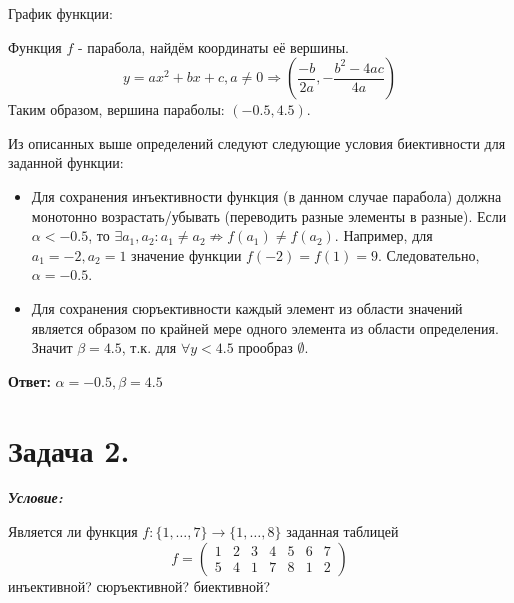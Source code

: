 График функции:
\begin{figure}[H]
\end{figure}
\noindent Функция $f$ - парабола, найдём координаты её вершины.
\[ y = ax^2 + bx + c, a \ne 0 \Rightarrow \left( \frac{-b}{2a}, -\frac{b^2-4ac}{4a} \right) \]
Таким образом, вершина параболы: $(-0.5, 4.5)$.

Из описанных выше определений следуют следующие условия биективности для заданной функции:
\begin{itemize}
	\item Для сохранения инъективности функция (в данном случае парабола) должна монотонно возрастать/убывать (переводить разные элементы в разные). Если $\alpha < -0.5$, то $\exists a_1, a_2: a_1 \ne a_2 \not\Rightarrow f(a_1) \ne f(a_2)$. Например, для $a_1 = -2, a_2 = 1$ значение функции $f(-2) = f(1) = 9$. Следовательно, $\alpha = -0.5$.
	\item Для сохранения сюръективности каждый элемент из области значений является образом по крайней мере одного элемента из области определения. Значит $\beta = 4.5$, т.к. для $\forall y < 4.5$ прообраз $\emptyset$.
\end{itemize}

\noindent\textbf{Ответ:} $\alpha = -0.5, \beta = 4.5$

\section*{Задача 2.}

\noindent\textbf{\textit{Условие:}}

Является ли функция $f: \{1, \dots, 7\} \to \{1, \dots, 8\}$ заданная таблицей
\[
f =
\begin{pmatrix}
1 & 2 & 3 & 4 & 5 & 6 & 7 \\
5 & 4 & 1 & 7 & 8 & 1 & 2
\end{pmatrix}
\]
инъективной? сюръективной? биективной?

